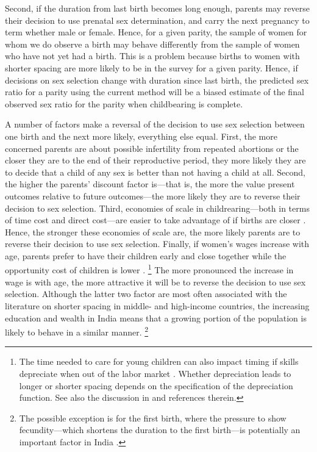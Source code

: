 \documentclass[12pt,letterpaper]{article}
\begin{document}
Second, if the duration from last birth becomes long enough, parents may 
reverse their decision to use prenatal sex determination,
and carry the next pregnancy to term whether male or female.
Hence, for a given parity, the sample of women for whom we do observe a birth 
may behave differently from the sample of women who have not yet had a birth.
This is a problem because births to women with shorter spacing are more likely 
to be in the survey for a given parity.
Hence, if decisions on sex selection change with duration since last birth,
the predicted sex ratio for a parity using the current method will be a 
biased estimate of the final observed sex ratio for the parity when 
childbearing is complete.

A number of factors make a reversal of the decision to use sex 
selection between one birth and the next more likely, 
everything else equal.
First, the more concerned parents are about possible infertility 
from repeated abortions or the closer they are to the end of their 
reproductive period, they more likely they are to decide that a 
child of any sex is better than not having a child at all.
Second, the higher the parents' discount factor is---that is, the
more the value present outcomes relative to future outcomes---the
more likely they are to reverse their decision to sex selection.
Third, economies of scale in childrearing---both in terms of time cost 
and direct cost---are easier to take advantage of if births 
are closer \citep[p 947]{Newman1984}.
Hence, the stronger these economies of scale are, the more likely
parents are to reverse their decision to use sex selection.
Finally, if women's wages increase with age, parents prefer
to have their children early and close together while 
the opportunity cost of children is lower \citep{Heckman1976}.%
\footnote{
The time needed to care for young children can also impact 
timing if skills depreciate when out of the labor market \citep{Happel1984}.
Whether depreciation leads to longer or shorter spacing depends
on the specification of the depreciation function.
See also the discussion in \citet[p 315]{Hotz1997}
and references therein.
}
The more pronounced the increase in wage is with age, the more 
attractive it will be to reverse the decision to use sex selection.
Although the latter two factor are most often associated with the literature
on shorter spacing in middle- and  high-income countries, 
the increasing education and wealth in India means that a growing 
portion of the population is likely to behave in a similar manner.%
\footnote{
The possible exception is for the first birth, where the pressure to show 
fecundity---which shortens the duration to the first birth---is potentially 
an important factor in India \citep{dyson83,Sethuraman2007,Dommaraju2009}.
}
\end{document}
